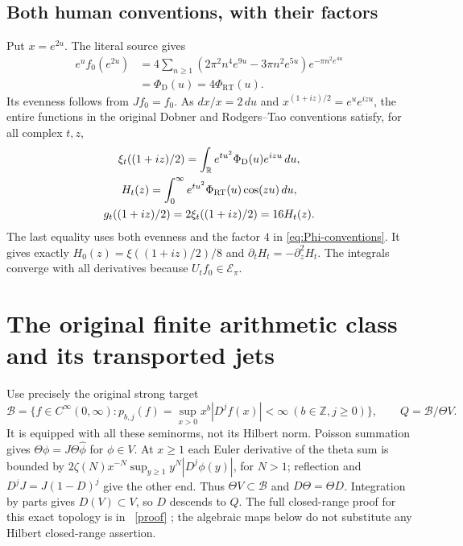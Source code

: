 \documentclass[11pt]{article}
\newcommand{\B}{\mathscr B}\newcommand{\Epi}{\mathscr E_\pi}
\begin{document}
\subsection{Both human conventions, with their factors}
Put $x=e^{2u}$. The literal source gives
\begin{equation}\label{eq:Phi-conventions}
\begin{split}
e^u f_0(e^{2u})
&=4\sum_{n\geq1}(2\pi^2n^4e^{9u}-3\pi n^2e^{5u})
e^{-\pi n^2e^{4u}}\\
&=\Phi_{\mathrm D}(u)=4\Phi_{\mathrm{RT}}(u).
\end{split}
\end{equation}
Its evenness follows from $Jf_0=f_0$. As $dx/x=2\,du$ and
$x^{(1+iz)/2}=e^ue^{izu}$, the entire functions in the original
Dobner and Rodgers--Tao conventions satisfy, for all complex $t,z$,
\begin{equation}\label{eq:constants}
\begin{gathered}
\xi_t((1+iz)/2)=\int_\mathbb R e^{tu^2}\Phi_{\mathrm D}(u)e^{izu}\,du,\\
H_t(z)=\int_0^\infty e^{tu^2}\Phi_{\mathrm{RT}}(u)\cos(zu)\,du,\\
g_t((1+iz)/2)=2\xi_t((1+iz)/2)=16H_t(z).
\end{gathered}
\end{equation}
The last equality uses both evenness and the factor $4$ in
\eqref{eq:Phi-conventions}. It gives exactly
$H_0(z)=\xi((1+iz)/2)/8$ and $\partial_tH_t=-\partial_z^2H_t$.
The integrals converge with all derivatives because $U_tf_0\in\Epi$.

\section{The original finite arithmetic class and its transported jets}

Use precisely the original strong target
\begin{equation}\label{eq:B}
\B=\{f\in C^\infty(0,\infty):
p_{b,j}(f)=\sup_{x>0}x^b|D^jf(x)|<\infty
\ (b\in\mathbb Z,j\geq0)\},\qquad Q=\B/\Theta V.
\end{equation}
It is equipped with all these seminorms, not its Hilbert norm.
Poisson summation gives $\Theta\phi=J\Theta\widehat\phi$ for
$\phi\in V$. At $x\geq1$ each Euler derivative of the theta sum
is bounded by $2\zeta(N)x^{-N}\sup_{y\geq1}y^N|D^j\phi(y)|$,
for $N>1$; reflection and $D^jJ=J(1-D)^j$ give the other end.
Thus $\Theta V\subset\B$ and $D\Theta=\Theta D$.
Integration by parts gives $D(V)\subset V$, so $D$ descends to $Q$.
The full closed-range proof for this exact topology is in
\cite{Closed}%
~\href{https://github.com/KokunoYumeto/zeta-function-research-reader/blob/5992ad50c0f2a06921f1fcaded7b4e38097c0739/workbenches/splitzero-tandem/continuations/20260920-original-kernel-mixed-determinants/providers/ORIGINAL_THETA_CLOSED_RANGE.tex\#L1}{[proof]}%
{}; the algebraic maps below do not substitute any
Hilbert closed-range assertion.
\end{document}
